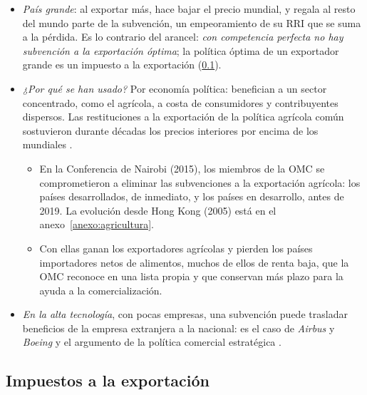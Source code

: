 \documentclass[11pt]{article}
\begin{document}
\begin{itemize}
\item \emph{País grande}: al exportar más, hace bajar el precio mundial, y regala al resto del mundo parte de la subvención, un empeoramiento de su RRI que se suma a la pérdida. Es lo contrario del arancel: \emph{con competencia perfecta no hay subvención a la exportación óptima}; la política óptima de un exportador grande es un impuesto a la exportación (\ref{sec:impuestos-exportacion}).
\item \emph{¿Por qué se han usado?} Por economía política: benefician a un sector concentrado, como el agrícola, a costa de consumidores y contribuyentes dispersos. Las restituciones a la exportación de la política agrícola común sostuvieron durante décadas los precios interiores por encima de los mundiales .
  \begin{itemize}
  \item En la Conferencia de Nairobi (2015), los miembros de la OMC se comprometieron a eliminar las subvenciones a la exportación agrícola: los países desarrollados, de inmediato, y los países en desarrollo, antes de 2019\nocite{OMC2015CompetenciaExportaciones}. La evolución desde Hong Kong (2005) está en el anexo~\ref{anexo:agricultura}.
  \item Con ellas ganan los exportadores agrícolas y pierden los países importadores netos de alimentos, muchos de ellos de renta baja, que la OMC reconoce en una lista propia y que conservan más plazo para la ayuda a la comercialización\nocite{OMC2015CompetenciaExportaciones}.
  \end{itemize}
\item \emph{En la alta tecnología}, con pocas empresas, una subvención puede trasladar beneficios de la empresa extranjera a la nacional\nocite{BranderSpencer1985Export}: es el caso de \emph{Airbus} y \emph{Boeing} y el argumento de la política comercial estratégica .
\end{itemize}

\subsection{Impuestos a la exportación}\label{sec:impuestos-exportacion}
\end{document}

